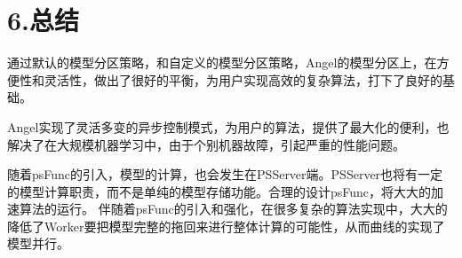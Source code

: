 \documentclass{article}
\begin{document}
\section{6.\hspace*{0.5em}总结}\label{section}%

\noindent{}通过默认的模型分区策略，和自定义的模型分区策略，Angel的模型分区上，在方便性和灵活性，做出了很好的平衡，为用户实现高效的复杂算法，打下了良好的基础。%

Angel实现了灵活多变的异步控制模式，为用户的算法，提供了最大化的便利，也解决了在大规模机器学习中，由于个别机器故障，引起严重的性能问题。%

随着psFunc的引入，模型的计算，也会发生在PSServer端。PSServer也将有一定的模型计算职责，而不是单纯的模型存储功能。合理的设计psFunc，将大大的加速算法的运行。
伴随着psFunc的引入和强化，在很多复杂的算法实现中，大大的降低了Worker要把模型完整的拖回来进行整体计算的可能性，从而曲线的实现了模型并行。%
\end{document}
